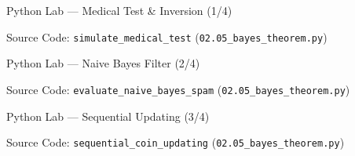 \documentclass[10pt, aspectratio=169]{beamer}
\begin{document}
\begin{frame}[fragile]{Python Lab --- Medical Test \& Inversion (1/4)}
  \vspace{-0.1cm}
  \begin{block}{Source Code: \texttt{simulate\_medical\_test} (\texttt{02.05\_bayes\_theorem.py})}
    
  \end{block}
\end{frame}

\begin{frame}[fragile]{Python Lab --- Naive Bayes Filter (2/4)}
  \vspace{-0.1cm}
  \begin{block}{Source Code: \texttt{evaluate\_naive\_bayes\_spam} (\texttt{02.05\_bayes\_theorem.py})}
    
  \end{block}
\end{frame}

\begin{frame}[fragile]{Python Lab --- Sequential Updating (3/4)}
  \vspace{-0.1cm}
  \begin{block}{Source Code: \texttt{sequential\_coin\_updating} (\texttt{02.05\_bayes\_theorem.py})}
    
  \end{block}
\end{frame}
\end{document}
